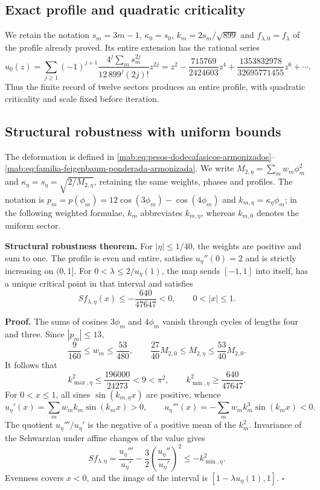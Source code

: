 \subsection{Exact profile and quadratic criticality}
\label{hmtfg:desarrollo:2}

We retain the notation $s_m=3m-1$, $\kappa_0=s_0$, $k_m=2s_m/\sqrt{899}$ and $f_{\lambda,0}=f_\lambda$ of the profile already proved. Its entire extension has the rational series
\[
u_0(z)=\sum_{j\ge1}(-1)^{j+1}
\frac{4^j\sum_m s_m^{2j}}{12\,899^j(2j)!}z^{2j}
=z^2-\frac{715769}{2424603}z^4
+\frac{1353832978}{32695771455}z^6+\cdots.
\]
Thus the finite record of twelve sectors produces an entire profile, with quadratic criticality and scale fixed before iteration.


\subsection{Structural robustness with uniform bounds}
\label{hmtfg:desarrollo:3}

The deformation is defined in \eqref{mab:eq:pesos-dodecafasicos-armonizados}--\eqref{mab:eq:familia-feigenbaum-ponderada-armonizada}. We write $M_{2,\eta}=\sum_mw_m\phi_m^2$ and $\kappa_\eta=s_\eta=\sqrt{2/M_{2,\eta}}$, retaining the same weights, phases and profiles.
The notation is $p_m=p(\phi_m)=12\cos(3\phi_m)-\cos(4\phi_m)$ and $k_{m,\eta}=\kappa_\eta\phi_m$; in the following weighted formulae, $k_m$ abbreviates $k_{m,\eta}$, whereas $k_{m,0}$ denotes the uniform sector.

\textbf{Structural robustness theorem.} For \(|\eta|\le1/40\), the weights are positive and sum to one. The profile is even and entire, satisfies \(u_\eta''(0)=2\) and is strictly increasing on \((0,1]\). For \(0<\lambda\le2/u_\eta(1)\), the map sends \([-1,1]\) into itself, has a unique critical point in that interval and satisfies
\[
S f_{\lambda,\eta}(x)\le-\frac{640}{47647}<0,\qquad0<|x|\le1.
\]

\textbf{Proof.} The sums of cosines \(3\phi_m\) and \(4\phi_m\) vanish through cycles of lengths four and three. Since \(|p_m|\le13\),
\[
\frac9{160}\le w_m\le\frac{53}{480},\qquad
\frac{27}{40}M_{2,0}\le M_{2,\eta}\le\frac{53}{40}M_{2,0}.
\]
It follows that
\[
k_{\max,\eta}^2\le\frac{196000}{24273}<9<\pi^2,\qquad
k_{\min,\eta}^2\ge\frac{640}{47647}.
\]
For \(0<x\le1\), all sines \(\sin(k_{m,\eta}x)\) are positive, whence
\[
u_\eta'(x)=\sum_mw_mk_m\sin(k_mx)>0,\qquad
u_\eta'''(x)=-\sum_mw_mk_m^3\sin(k_mx)<0.
\]
The quotient \(u_\eta'''/u_\eta'\) is the negative of a positive mean of the \(k_m^2\). Invariance of the Schwarzian under affine changes of the value gives
\[
S f_{\lambda,\eta}
=\frac{u_\eta'''}{u_\eta'}-\frac32
\left(\frac{u_\eta''}{u_\eta'}\right)^2
\le-k_{\min,\eta}^2.
\]
Evenness covers \(x<0\), and the image of the interval is
\([1-\lambda u_\eta(1),1]\). \(\square\)

